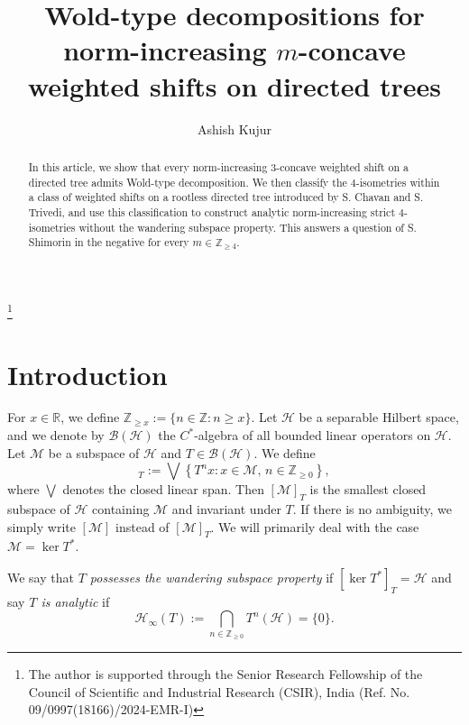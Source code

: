 \documentclass[11pt, reqno, a4paper]{amsart}
\theoremstyle{definition}
\newcommand{\calB}{{\mathcal{B}}}
\newcommand{\calH}{{\mathcal{H}}}
\newcommand{\calM}{{\mathcal{M}}}
\renewcommand{\ge}{\geqslant}
\newcommand{\R}{\mathbb R}
\newcommand{\Z}{\mathbb Z}
\numberwithin{equation}{section}
\begin{document}
\title[Wold-type decompositions for weighted shifts on directed trees]{Wold-type decompositions for norm-increasing $m$-concave weighted shifts on directed trees}
\author[Ashish Kujur]{Ashish Kujur }
\address{School of Mathematics, Indian Institute of Science Education and Research, Thiruvananthapuram}
\thanks{The author is supported through the Senior Research Fellowship of the Council of Scientific and Industrial Research (CSIR), India (Ref. No. 09/0997(18166)/2024-EMR-I)}

\begin{abstract}
    In this article, we show that every norm-increasing $3$-concave weighted
    shift on a directed tree admits Wold-type decomposition. We then classify the $4$-isometries within a class of weighted shifts on a rootless directed tree introduced by S. Chavan and S. Trivedi, and use this classification to construct analytic norm-increasing strict $4$-isometries without the wandering subspace property. This answers a question of S. Shimorin in the negative for every $m\in \mathbb{Z}_{\ge 4}$.
\end{abstract}

\maketitle

\section{Introduction}
    For $x \in \R$, we define $\mathbb{Z}_{\ge x} := \{ n \in \Z : n \ge x \}$. Let $\calH$ be a separable Hilbert space, and we denote by $\calB (\calH)$ the $C^{*}$-algebra of all bounded linear operators on $\calH$. Let $\calM$ be a subspace of $\calH$ and $T \in \calB (\calH)$. We define
    \begin{equation*}
        [\calM]_{T} := \bigvee \left\{ T^{n} x : x \in \calM, \, n \in \Z_{\ge 0} \right\},
    \end{equation*}
    where $\bigvee$ denotes the closed linear span. Then $[\calM]_{T}$ is the smallest closed subspace of $\calH$ containing $\calM$ and invariant under $T$. If there is no ambiguity, we simply write $[\mathcal{M}]$ instead of $\left[ \mathcal{M} \right]_{T}$. We will primarily deal with the case $\calM = \ker T^{*}$.

    We say that \textit{$T$ possesses the wandering subspace property} if $[\ker T^{*}]_T = \calH$ and say \textit{$T$ is analytic} if
    \begin{equation*}
        \calH_{\infty} (T) := \bigcap_{n \in \Z_{\ge 0}} T^n (\calH) = \{ 0 \}.
    \end{equation*}
\end{document}
